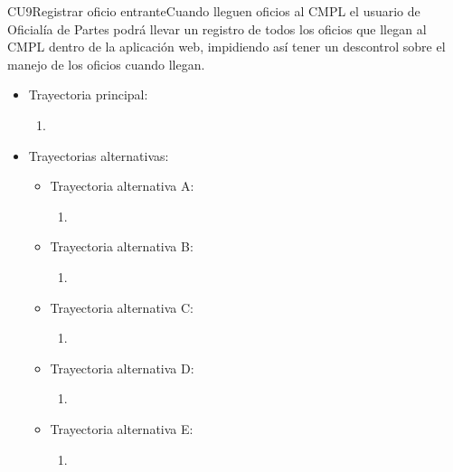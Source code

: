 \begin{UseCase}{CU9}{Registrar oficio entrante}{Cuando lleguen oficios al CMPL el usuario de Oficialía de Partes podrá llevar un registro de todos los oficios que llegan al CMPL dentro de la aplicación web, impidiendo así tener un descontrol sobre el manejo de los oficios cuando llegan.}
	\end{UseCase}

\begin{itemize}	
	\item Trayectoria principal:
		\begin{enumerate}
			\item 
		\end{enumerate}
	\item Trayectorias alternativas:
		\begin{itemize}
			\item Trayectoria alternativa A: 
				\begin{enumerate}
					\item 
				\end{enumerate}
			\item Trayectoria alternativa B: 
				\begin{enumerate}
					\item 
				\end{enumerate}
			\item Trayectoria alternativa C:
				\begin{enumerate}
					\item
				\end{enumerate}
			\item Trayectoria alternativa D: 
				\begin{enumerate}
					\item 
				\end{enumerate}
			\item Trayectoria alternativa E: 
				\begin{enumerate}
					\item 
				\end{enumerate}
		\end{itemize}
\end{itemize}

